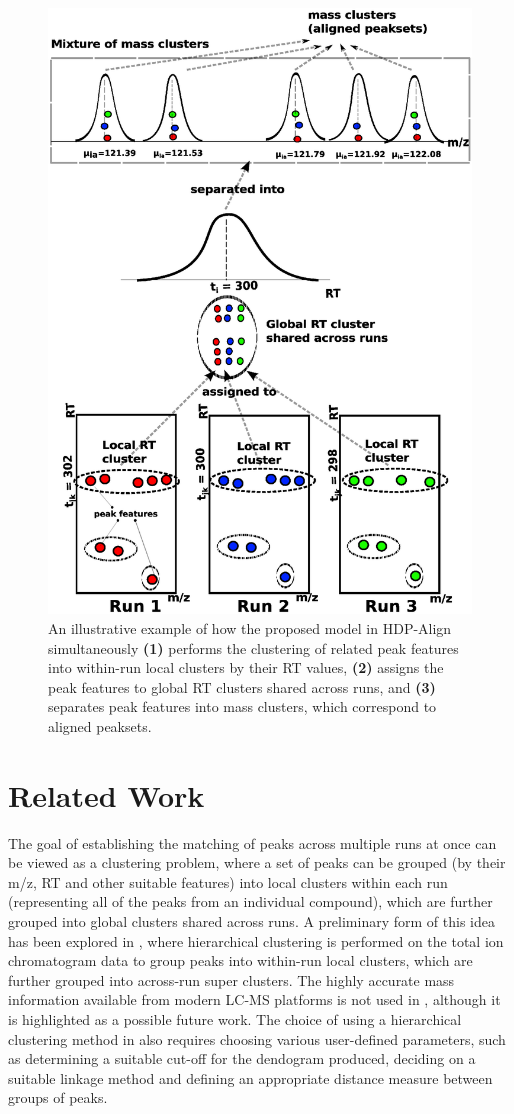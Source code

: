 \begin{figure}[!htbp]
\centering\includegraphics[width=0.50\linewidth]{06-hdp/figures/figure_1.eps}
\centering\caption{An illustrative example of how the proposed model in HDP-Align simultaneously \textbf{(1)} performs the clustering of related peak features into within-run local clusters by their RT values, \textbf{(2)} assigns the peak features to global \ac{RT} clusters shared across runs, and \textbf{(3)} separates peak features into mass clusters, which correspond to aligned peaksets.\label{fig-hdp-cartoon}}
\end{figure}

\section{Related Work}

The goal of establishing the matching of peaks across multiple runs at once can be viewed as a clustering problem, where a set of peaks can be grouped (by their m/z, RT and other suitable features) into local clusters within each run (representing all of the peaks from an individual compound), which are further grouped into global clusters shared across runs. A preliminary form of this idea has been explored in \cite{DeSouza2006}, where hierarchical clustering is performed on the total ion chromatogram data to group peaks into within-run local clusters, which are further grouped into across-run super clusters. The highly accurate mass information available from modern LC-MS platforms is not used in \cite{DeSouza2006}, although it is highlighted as a possible future work. The choice of using a hierarchical clustering method in \cite{DeSouza2006} also requires choosing various user-defined parameters, such as determining a suitable cut-off for the dendogram produced, deciding on a suitable linkage method and defining an appropriate distance measure between groups of peaks.

